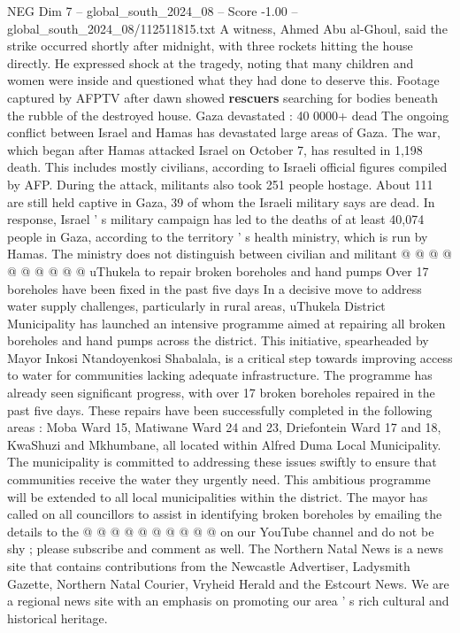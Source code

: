 \begin{textsample}{NEG Dim 7 – global\_south\_2024\_08 – Score -1.00 – global\_south\_2024\_08/112511815.txt}  \label{ex:f7_neg_274}
A witness, Ahmed Abu al-Ghoul, said the strike occurred shortly after midnight, with three rockets hitting the house directly.
He expressed shock at the tragedy, noting that many children and women were inside and questioned what they had done to deserve this.
Footage captured by AFPTV after dawn showed \textbf{rescuers} searching for bodies beneath the rubble of the destroyed house.
Gaza devastated : 40 0000+ dead The ongoing conflict between Israel and Hamas has devastated large areas of Gaza.
The war, which began after Hamas attacked Israel on October 7, has resulted in 1,198 death.
This includes mostly civilians, according to Israeli official figures compiled by AFP.
During the attack, militants also took 251 people hostage.
About 111 are still held captive in Gaza, 39 of whom the Israeli military says are dead.
In response, Israel ' s military campaign has led to the deaths of at least 40,074 people in Gaza, according to the territory ' s health ministry, which is run by Hamas.
The ministry does not distinguish between civilian and militant @ @ @ @ @ @ @ @ @ @ uThukela to repair broken boreholes and hand pumps Over 17 boreholes have been fixed in the past five days In a decisive move to address water supply challenges, particularly in rural areas, uThukela District Municipality has launched an intensive programme aimed at repairing all broken boreholes and hand pumps across the district.
This initiative, spearheaded by Mayor Inkosi Ntandoyenkosi Shabalala, is a critical step towards improving access to water for communities lacking adequate infrastructure.
The programme has already seen significant progress, with over 17 broken boreholes repaired in the past five days.
These repairs have been successfully completed in the following areas : Moba Ward 15, Matiwane Ward 24 and 23, Driefontein Ward 17 and 18, KwaShuzi and Mkhumbane, all located within Alfred Duma Local Municipality.
The municipality is committed to addressing these issues swiftly to ensure that communities receive the water they urgently need.
This ambitious programme will be extended to all local municipalities within the district.
The mayor has called on all councillors to assist in identifying broken boreholes by emailing the details to the @ @ @ @ @ @ @ @ @ @ on our YouTube channel and do not be shy ; please subscribe and comment as well.
The Northern Natal News is a news site that contains contributions from the Newcastle Advertiser, Ladysmith Gazette, Northern Natal Courier, Vryheid Herald and the Estcourt News.
We are a regional news site with an emphasis on promoting our area ' s rich cultural and historical heritage.

\end{textsample}
